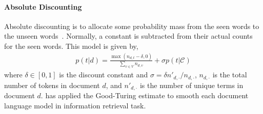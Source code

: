 \paragraph{Absolute Discounting}

Absolute discounting is to allocate some probability mass from the seen words to the unseen words~\cite{Ney-1994}. Normally, a constant is subtracted from their actual counts for the seen words. This model is given by,
\begin{align}
p(t|d) = \frac{\max(n_{d,t} - \delta, 0)}{\sum_{v \in V} n_{d,v}} + \sigma p(t|\mathcal{C})
\end{align}
where $\delta \in [0,1]$ is the discount constant and $\sigma = \delta n'_{d,\cdot} / n_{d, \cdot}$, $n_{d, \cdot}$ is the total number of tokens in document $d$, and $n'_{d,\cdot}$ is the number of unique terms in document $d$. \cite{song-99} has applied the Good-Turing estimate to smooth each document language model in information retrieval task.


